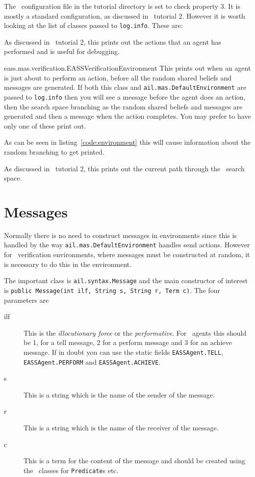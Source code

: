\documentclass[a4]{article}
\begin{document}
The \jpf\ configuration file in the tutorial directory is set to check property 3.  It is mostly a standard configuration, as discussed in \ajpf\ tutorial 2.  However it is worth looking at the list of classes passed to \texttt{log.info}.  These are:
\begin{description}
\item[ail.mas.DefaultEnvironment] As discussed in \ajpf\ tutorial 2, this prints out the actions that an agent has performed and is useful for debugging.
\begin{sloppypar}
\item[eass.mas.verification.EASSVerificationEnvironment] This prints out when an agent is just about to perform an action, before all the random shared beliefs and messages are generated.  If both this class and \texttt{ail.mas.DefaultEnvironment} are passed to \texttt{log.info} then you will see a message before the agent does an action, then the search space branching as the random shared beliefs and messages are generated and then a message when the action completes.  You may prefer to have only one of these print out.
\end{sloppypar}
\item[eass.tutorials.tutorial3.VerificationEnvironment] As can be seen in listing~\ref{code:environment} this will cause information about the random branching to get printed.
\item[ajpf.product.Product] As discussed in \ajpf\ tutorial 2, this prints out the current path through the \ajpf\ search space.
\end{description}

\section{Messages}
Normally there is no need to construct messages in environments since this is handled by the way \texttt{ail.mas.DefaultEnvironment} handles send actions.  However for \eass\ verification environments, where messages must be constructed at random, it is necessary to do this in the environment.

The important class is \texttt{ail.syntax.Message} and the main constructor of interest is \texttt{public Message(int ilf, String s, String r, Term c)}.  The four parameters are
\begin{description}
\item[ilf] This is the \emph{illocutionary force} or the \emph{performative}.  For \eass\ agents this should be 1, for a tell message, 2 for a perform message and 3 for an achieve message.  If in doubt you can use the static fields \texttt{EASSAgent.TELL}, \texttt{EASSAgent.PERFORM} and \texttt{EASSAgent.ACHIEVE}.
\item[s] This is a string which is the name of the sender of the message.
\item[r] This is a string which is the name of the receiver of the message.
\item[c] This is a term for the content of the message and should be created using the \ail\ classes for \texttt{Predicate}s etc.
\end{description}
\end{document}
